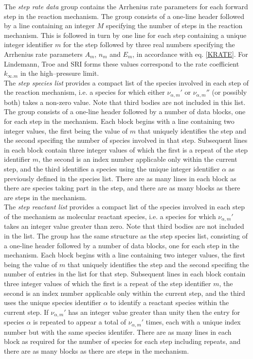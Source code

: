 \documentclass[dvips]{article}
\begin{document}
\noindent
The {\it step rate data} group contains the Arrhenius rate parameters for each
forward step in the reaction mechanism.  The group
consists of a one-line header followed by a line containing an integer $M$
specifying the number of steps in the reaction mechanism.  This is followed in
turn by one line for each step containing a unique integer identifier
$m$ for the step followed by three real numbers specifying the Arrhenius
rate parameters $A_{m}$, $n_{m}$ and $E_{m}$, in accordance with
eq. \ref{KRATE}.  For Lindemann, Troe and SRI forms these values
correspond to the rate coefficient $k_{\infty.m}$ in the high--pressure
limit.\\

\noindent
The {\it step species list} provides a compact
list of the species involved in each step of the reaction mechanism,
i.e. a species for which either $\nu_{\alpha,m}'$ or $\nu_{\alpha,m}''$
(or possibly both) takes a non-zero value.
Note that third bodies are not included in this list.
The group consists of a
one-line header followed by a number of data blocks, one for each step
in the mechanism.  Each block begins with a line containing two
integer values, the first being the value of $m$ that uniquely
identifies the step and the second specifing the number of species
involved in that step.  Subsequent lines in each block contain three
integer values of which the first is a repeat of the step
identifier $m$, the second
is an index number applicable only within the current step, and the
third identifies a species using the unique integer identifier $\alpha$ 
as previously defined in the species list.  There are as many lines in each
block
as there are species taking part in the step, and there are as many
blocks as there are steps in the mechanism.\\

\noindent
The {\it step reactant list} provides a compact
list of the species involved in each step of the
mechanism as molecular reactant species, i.e. a species for which
$\nu_{\alpha,m}'$ takes an integer value greater than zero.
Note that third bodies are not included in the list.
The group has the same
structure as the step species list, consisting of a 
one-line header followed by a number of data blocks, one for each step
in the mechanism.  Each block begins with a line containing two
integer values, the first being the value of $m$ that uniquely
identifies the step and the second specifing the number of entries in
the list for that step.  Subsequent lines in each block contain three
integer values of which the first is a repeat of the step
identifier $m$, the second
is an index number applicable only within the current step, and the
third uses the unique species identifier $\alpha$ to identify a reactant
species within the current step.  If $\nu_{\alpha,m}'$ has an integer
value greater than unity
then the entry for species $\alpha$ is repeated to appear a total of
$\nu_{\alpha,m}'$ times, each with a unique index number but with the same
species identifer.  There are as many lines in each block
as required for the number of species for each step including repeats,
and there are as many blocks as there are steps in the mechanism.\\
\end{document}
